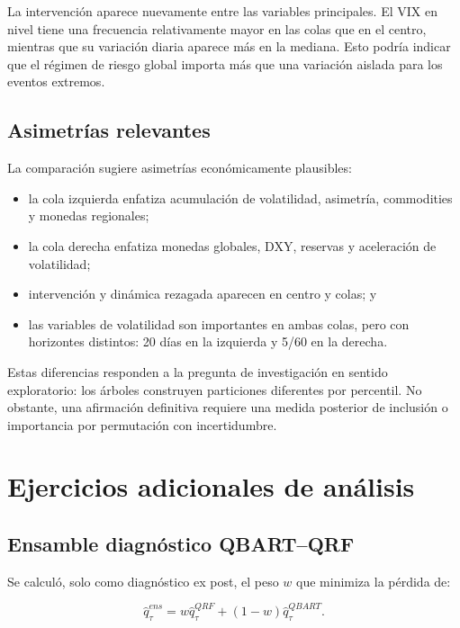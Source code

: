 \documentclass[11pt,a4paper]{article}
\begin{document}
La intervención aparece nuevamente entre las variables principales. El VIX
en nivel tiene una frecuencia relativamente mayor en las colas que en el
centro, mientras que su variación diaria aparece más en la mediana. Esto
podría indicar que el régimen de riesgo global importa más que una variación
aislada para los eventos extremos.

\subsection{Asimetrías relevantes}

La comparación sugiere asimetrías económicamente plausibles:

\begin{itemize}[leftmargin=*]
  \item la cola izquierda enfatiza acumulación de volatilidad, asimetría,
  commodities y monedas regionales;
  \item la cola derecha enfatiza monedas globales, DXY, reservas y aceleración
  de volatilidad;
  \item intervención y dinámica rezagada aparecen en centro y colas; y
  \item las variables de volatilidad son importantes en ambas colas, pero con
  horizontes distintos: 20 días en la izquierda y 5/60 en la derecha.
\end{itemize}

Estas diferencias responden a la pregunta de investigación en sentido
exploratorio: los árboles construyen particiones diferentes por percentil.
No obstante, una afirmación definitiva requiere una medida posterior de
inclusión o importancia por permutación con incertidumbre.

\section{Ejercicios adicionales de análisis}

\subsection{Ensamble diagnóstico QBART--QRF}

Se calculó, solo como diagnóstico ex post, el peso \(w\) que minimiza la
pérdida de:

\begin{equation}
  \widehat q_{\tau}^{ens}
  =
  w\widehat q_{\tau}^{QRF}
  +(1-w)\widehat q_{\tau}^{QBART}.
\end{equation}
\end{document}

